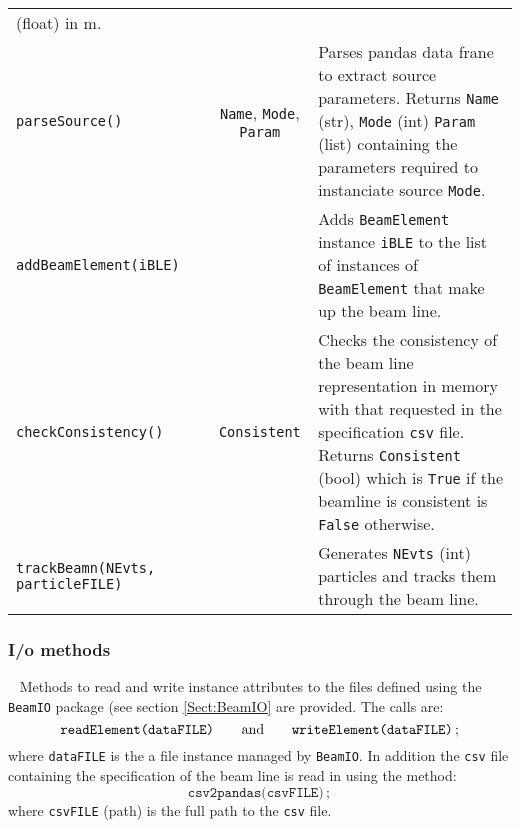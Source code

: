\begin{table}[h]
\begin{center}
\begin{tabular}{|l|c|c|p{7cm}|}
                                                                                 (float) in m.                                 \\
      \texttt{parseSource()}   &  & \texttt{Name}, \texttt{Mode}, \texttt{Param} & Parses pandas data frane to extract
                                                                                 source parameters.
                                                                                 Returns \texttt{Name} (str), \texttt{Mode} (int)
                                                                                 \texttt{Param} (list) containing the parameters
                                                                                 required to instanciate source \texttt{Mode}. \\
      \texttt{addBeamElement(iBLE)} &  &  & Adds \texttt{BeamElement} instance \texttt{iBLE} to the list of instances of
                                                     \texttt{BeamElement} that make up the beam line.                      \\
      \texttt{checkConsistency()} &  & \texttt{Consistent} & Checks the consistency of the beam line representation in memory
                                                             with that requested in the specification \texttt{csv} file.
                                                             Returns \texttt{Consistent} (bool) which is \texttt{True} if the
                                                             beamline is consistent is \texttt{False} otherwise.                     \\
      \texttt{trackBeamn(NEvts, particleFILE)} &  &  & Generates \texttt{NEvts} (int) particles and tracks them through the
                                                       beam line. \\
      \hline
    \end{tabular}
  \end{center}
\end{table}

\subsubsection{I/o methods} ~\newline
\noindent
Methods to read and write instance attributes to the files defined
using the \texttt{BeamIO} package (see section \ref{Sect:BeamIO} are
provided.
The calls are:
\begin{equation}
  \texttt{readElement(dataFILE)} \quad \quad {\rm and }
      \quad \quad \texttt{writeElement(dataFILE)} \,; \nonumber
\end{equation}
where \texttt{dataFILE} is the a file instance managed by \texttt{BeamIO}.
In addition the \texttt{csv} file containing the specification of the
beam line is read in using the method:
\begin{equation}
  \texttt{csv2pandas(csvFILE)} \,; \nonumber
\end{equation}
where \texttt{csvFILE} (path) is the full path to the \texttt{csv}
file.

